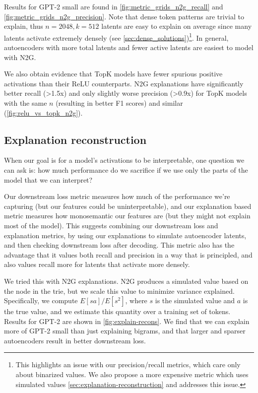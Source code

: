 Results for GPT-2 small are found in \autoref{fig:metric_grids_n2g_recall} and \ref{fig:metric_grids_n2g_precision}.  Note that dense token patterns are trivial to explain, thus $n=2048,k=512$ latents are easy to explain on average since many latents activate extremely densely (see \autoref{sec:dense_solutions})\footnote{This highlights an issue with our precision/recall metrics, which care only about binarized values.  We also propose a more expensive metric which uses simulated values \autoref{sec:explanation-reconstruction} and addresses this issue.  %
}.
In general, autoencoders with more total latents and fewer active latents are easiest to model with N2G.


We also obtain evidence that TopK models have fewer spurious positive activations than their ReLU counterparts.  N2G explanations have significantly better recall (>1.5x) and only slightly worse precision (>0.9x) for TopK models with the same $n$ (resulting in better F1 scores) and similar \Lzero (\autoref{fig:relu_vs_topk_n2g}).






\subsection{Explanation reconstruction}
\label{sec:explanation-reconstruction}

When our goal is for a model's activations to be interpretable, one question we can ask is:  how much performance do we sacrifice if we use only the parts of the model that we can interpret?  

Our downstream loss metric measures how much of the performance we're capturing (but our features could be uninterpretable), and our explanation based metric measures how monosemantic our features are (but they might not explain most of the model). This suggests combining our downstream loss and explanation metrics, by using our explanations to simulate autoencoder latents, and then checking downstream loss after decoding.  This metric also has the advantage that it values both recall and precision in a way that is principled, and also values recall more for latents that activate more densely.

We tried this with N2G explanations.  N2G produces a simulated value based on the node in the trie, but we scale this value to minimize variance explained.  Specifically, we compute $E[sa]/E[s^2]$, where $s$ is the simulated value and $a$ is the true value, and we estimate this quantity over a training set of tokens.  %
Results for GPT-2 are shown in \autoref{fig:explain-recons}.  We find that we can explain more of GPT-2 small than just explaining bigrams, and that larger and sparser autoencoders result in better downstream loss.

